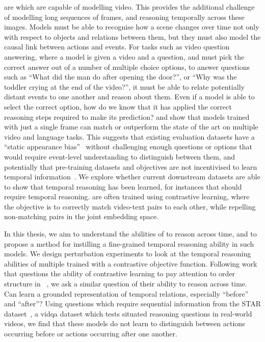  are  which are capable of modelling video.
This provides the additional challenge of modelling long sequences of frames,
and reasoning temporally across these images. Models must be able to recognise
how a scene changes over time not only with respect to objects and relations
between them, but they must also model the causal link between actions and
events. For tasks such as video question answering, where a model is given a
video and a question, and must pick the correct answer out of a number of
multiple choice options, to answer questions such as ``What did the man do
after opening the door?'', or ``Why was the toddler crying at the end of the
video?'', it must be able to relate potentially distant events to one another
and reason about them.  Even if a model is able to select the correct option,
how do we know that it has applied the correct reasoning steps required to make
its prediction?  \citet{lei2023revealing} and \citet{buch2022revisiting} show
that models trained with just a single frame can match or outperform the state
of the art on multiple video and language tasks. This suggests that existing
evaluation datasets have a ``static appearance bias''~\citep{lei2023revealing}
without challenging enough questions or options that would require event-level
understanding to distinguish between them, and potentially that pre-training
datasets and objectives are not incentivised to learn temporal %
information~\citep{momeni2023verbs}. We explore whether current downstream
datasets are able to show that temporal reasoning has been learned, for
instances that should require temporal reasoning.  are often
trained using contrastive learning, where the objective is to correctly match
video-text pairs to each other, while repelling non-matching pairs in the joint
embedding space. 

In this thesis, we aim to understand the abilities of  to
reason across time, and to propose a method for instilling a fine-grained
temporal reasoning ability in such models. We design perturbation experiments
to look at the temporal reasoning abilities of multiple 
trained with a contrastive objective function. Following work that questions
the ability of contrastive learning to pay attention to order structure in
~\citep{yuksekgonul2023when}, we ask a similar question of
their ability to reason across time. Can  learn a grounded
representation of temporal relations, especially ``before'' and ``after''?
Using questions which require sequential information from the STAR %
dataset~\citep{wu2021star}, a \acrfull{vidqa} dataset which tests situated
reasoning questions in real-world videos, we find that these models do not
learn to distinguish between actions occurring before or actions occurring
after one another.

